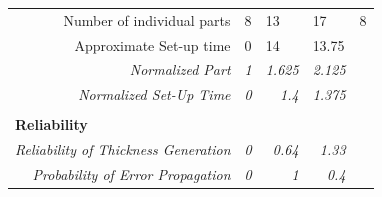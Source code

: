 \documentclass[12pt]{article}
\begin{document}
\begin{table}[h]
{\begin{tabular}{rllll}
Number of individual parts                     & 8                                                                 & 13                                                                & 17                                                                & 8                         \\
Approximate Set-up time                        & 0                                                                 & 14                                                                 & 13.75                                                             &                           \\
\rowcolor[HTML]{C0C0C0} 
\textit{Normalized Part}                       & \multicolumn{1}{r}{\cellcolor[HTML]{C0C0C0}\textit{1}}            & \multicolumn{1}{r}{\cellcolor[HTML]{C0C0C0}\textit{1.625}}        & \multicolumn{1}{r}{\cellcolor[HTML]{C0C0C0}\textit{2.125}}        & \textit{}                 \\
\rowcolor[HTML]{C0C0C0} 
\textit{Normalized Set-Up Time}                & \multicolumn{1}{r}{\cellcolor[HTML]{C0C0C0}\textit{0}}            & \multicolumn{1}{r}{\cellcolor[HTML]{C0C0C0}\textit{1.4}}          & \multicolumn{1}{r}{\cellcolor[HTML]{C0C0C0}\textit{1.375}}        & \textit{}                 \\
\multicolumn{1}{l}{}                           &                                                                   &                                                                   &                                                                   &                           \\
\multicolumn{1}{l}{\textbf{Reliability}}       &                                                                   &                                                                   &                                                                   &                           \\ \cline{1-1}
\rowcolor[HTML]{C0C0C0} 
\textit{Reliability of Thickness Generation}   & \multicolumn{1}{r}{\cellcolor[HTML]{C0C0C0}\textit{0}}            & \multicolumn{1}{r}{\cellcolor[HTML]{C0C0C0}\textit{0.64}}        & \multicolumn{1}{r}{\cellcolor[HTML]{C0C0C0}\textit{1.33}}        & \textit{}                \\

\rowcolor[HTML]{C0C0C0} 
\textit{Probability of Error Propagation}   & \multicolumn{1}{r}{\cellcolor[HTML]{C0C0C0}\textit{0}}            & \multicolumn{1}{r}{\cellcolor[HTML]{C0C0C0}\textit{1}}        & \multicolumn{1}{r}{\cellcolor[HTML]{C0C0C0}\textit{0.4}}        & \textit{}                \\


\end{tabular}}
\end{table}
\end{document}
